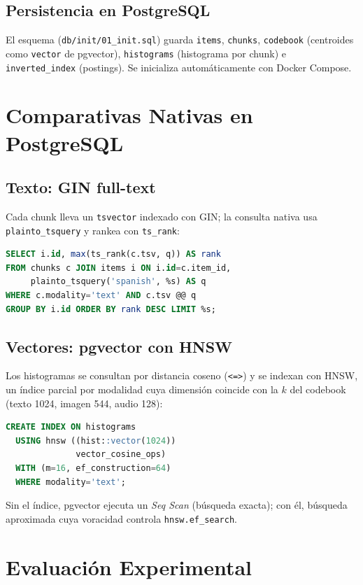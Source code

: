 \documentclass[conference]{IEEEtran}
\begin{document}
\subsection{Persistencia en PostgreSQL}
El esquema (\texttt{db/init/01\_init.sql}) guarda \texttt{items},
\texttt{chunks}, \texttt{codebook} (centroides como \texttt{vector} de
pgvector), \texttt{histograms} (histograma por chunk) e
\texttt{inverted\_index} (postings). Se inicializa automáticamente con Docker
Compose.

\section{Comparativas Nativas en PostgreSQL}

\subsection{Texto: GIN full-text}
Cada chunk lleva un \texttt{tsvector} indexado con GIN; la consulta nativa
usa \texttt{plainto\_tsquery} y rankea con \texttt{ts\_rank}:
\begin{lstlisting}[language=SQL]
SELECT i.id, max(ts_rank(c.tsv, q)) AS rank
FROM chunks c JOIN items i ON i.id=c.item_id,
     plainto_tsquery('spanish', %s) AS q
WHERE c.modality='text' AND c.tsv @@ q
GROUP BY i.id ORDER BY rank DESC LIMIT %s;
\end{lstlisting}

\subsection{Vectores: pgvector con HNSW}
Los histogramas se consultan por distancia coseno (\texttt{<=>}) y se indexan
con HNSW, un índice parcial por modalidad cuya dimensión coincide con la $k$
del codebook (texto 1024, imagen 544, audio 128):
\begin{lstlisting}[language=SQL]
CREATE INDEX ON histograms
  USING hnsw ((hist::vector(1024))
              vector_cosine_ops)
  WITH (m=16, ef_construction=64)
  WHERE modality='text';
\end{lstlisting}
Sin el índice, pgvector ejecuta un \textit{Seq Scan} (búsqueda exacta); con
él, búsqueda aproximada cuya voracidad controla \texttt{hnsw.ef\_search}.

\section{Evaluación Experimental}
\end{document}
